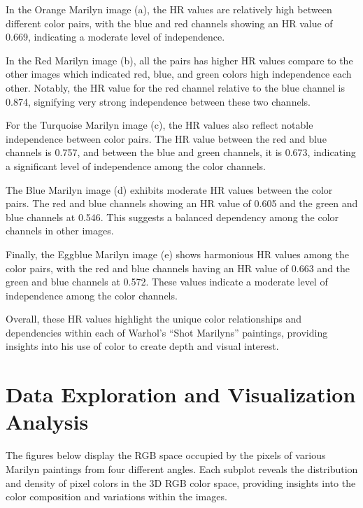 \documentclass{article}
\begin{document}
In the Orange Marilyn image (a), the HR values are relatively high
between different color pairs, with the blue and red channels showing an
HR value of 0.669, indicating a moderate level of independence.

In the Red Marilyn image (b), all the pairs has higher HR values compare
to the other images which indicated red, blue, and green colors high
independence each other. Notably, the HR value for the red channel
relative to the blue channel is 0.874, signifying very strong
independence between these two channels.

For the Turquoise Marilyn image (c), the HR values also reflect notable
independence between color pairs. The HR value between the red and blue
channels is 0.757, and between the blue and green channels, it is 0.673,
indicating a significant level of independence among the color channels.

The Blue Marilyn image (d) exhibits moderate HR values between the color
pairs. The red and blue channels showing an HR value of 0.605 and the
green and blue channels at 0.546. This suggests a balanced dependency
among the color channels in other images.

Finally, the Eggblue Marilyn image (e) shows harmonious HR values among
the color pairs, with the red and blue channels having an HR value of
0.663 and the green and blue channels at 0.572. These values indicate a
moderate level of independence among the color channels.

Overall, these HR values highlight the unique color relationships and
dependencies within each of Warhol's ``Shot Marilyns'' paintings,
providing insights into his use of color to create depth and visual
interest.

\hypertarget{data-exploration-and-visualization-analysis}{%
\section{Data Exploration and Visualization
Analysis}\label{data-exploration-and-visualization-analysis}}

The figures below display the RGB space occupied by the pixels of
various Marilyn paintings from four different angles. Each subplot
reveals the distribution and density of pixel colors in the 3D RGB color
space, providing insights into the color composition and variations
within the images.
\end{document}
